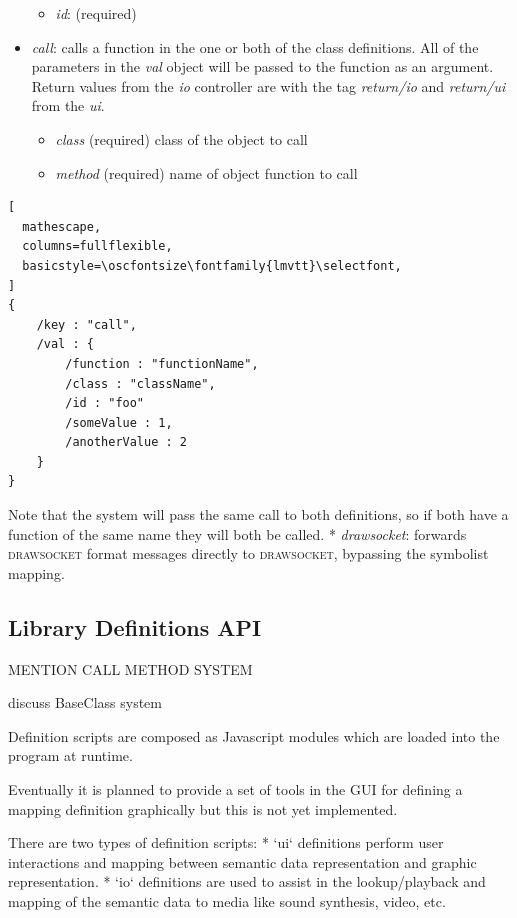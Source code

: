 \documentclass{article}
\def\drawsocket{\textsc{drawsocket}\xspace}
\def\oscfontsize{\footnotesize}
\begin{document}
\begin{itemize}
\begin{itemize}\itemsep0pt 
  \item \textit{id}: (required)
\end{itemize}
\item \textit{call}: calls a function in the one or both of the class definitions. All of the parameters in the \textit{val} object will be passed to the function as an argument. Return values from the \textit{io} controller are with the tag \textit{return/io} and \textit{return/ui} from the \textit{ui}.
\begin{itemize}\itemsep0pt 
  \item \textit{class} (required) class of the object to call
  \item \textit{method} (required) name of object function to call
\end{itemize}

\end{itemize}

\begin{lstlisting}[
  mathescape,
  columns=fullflexible,
  basicstyle=\oscfontsize\fontfamily{lmvtt}\selectfont,
]
{
    /key : "call",
    /val : {
        /function : "functionName",
        /class : "className",
        /id : "foo"
        /someValue : 1,
        /anotherValue : 2
    }
}
\end{lstlisting}

Note that the system will pass the same call to both definitions, so if both have a function of the same name they will both be called.
* \textit{drawsocket}: forwards \drawsocket format messages directly to \drawsocket, bypassing the symbolist mapping.


\subsection{Library Definitions API}\label{subsec:library_definitions_api}

MENTION CALL METHOD SYSTEM	


discuss BaseClass system


Definition scripts are composed as Javascript modules which are loaded into the program at runtime.

Eventually it is planned to provide a set of tools in the GUI for defining a mapping definition graphically but this is not yet implemented.

There are two types of definition scripts:
* `ui` definitions perform user interactions and mapping between semantic data representation and graphic representation.
* `io` definitions are used to assist in the lookup/playback and mapping of the semantic data to media like sound synthesis, video, etc.
\end{document}
